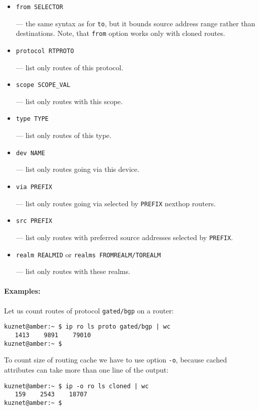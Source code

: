 \begin{itemize}
\item \verb|from SELECTOR|

--- the same syntax as for \verb|to|, but it bounds source address range
rather than destinations. Note, that \verb|from| option works only with
cloned routes.

\item \verb|protocol RTPROTO|

--- list only routes of this protocol.


\item \verb|scope SCOPE_VAL|

--- list only routes with this scope.

\item \verb|type TYPE|

--- list only routes of this type.

\item \verb|dev NAME|

--- list only routes going via this device.

\item \verb|via PREFIX|

--- list only routes going via selected by \verb|PREFIX| nexthop routers.

\item \verb|src PREFIX|

--- list only routes with preferred source addresses selected
by \verb|PREFIX|.

\item \verb|realm REALMID| or \verb|realms FROMREALM/TOREALM|

--- list only routes with these realms.

\end{itemize}

\paragraph{Examples:} Let us count routes of protocol \verb|gated/bgp|
on a router:
\begin{verbatim}
kuznet@amber:~ $ ip ro ls proto gated/bgp | wc
   1413    9891    79010
kuznet@amber:~ $
\end{verbatim}
To count size of routing cache we have to use option \verb|-o|,
because cached attributes can take more than one line of the output:
\begin{verbatim}
kuznet@amber:~ $ ip -o ro ls cloned | wc
   159    2543    18707
kuznet@amber:~ $
\end{verbatim}


